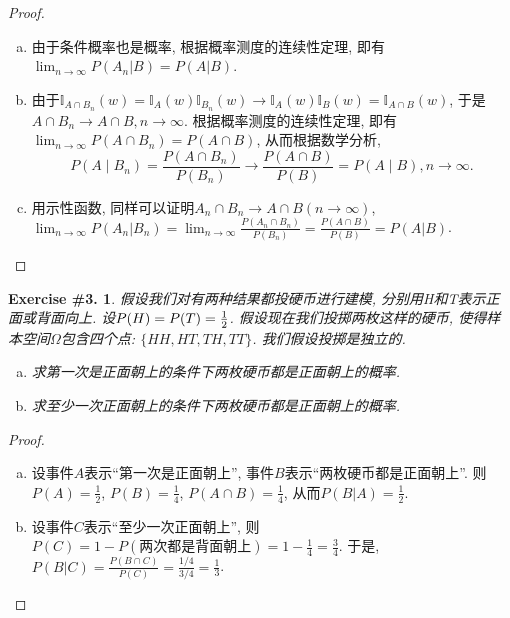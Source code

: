 \documentclass[UTF8, a4paper]{article}
\newtheorem{exercise}{Exercise \#3.}
\begin{document}
\begin{proof}
\begin{enumerate}[a)]
    \item 由于条件概率也是概率, 根据概率测度的连续性定理, 即有\(\lim_{n \to \infty} P(A_n |B) = P(A|B)\).
    \item 由于\(\mathbb{I}_{A\cap B_n}(w) =  \mathbb{I}_A (w)\mathbb{I}_{B_n}(w) \to \mathbb{I}_A(w) \mathbb{I}_B(w) = \mathbb{I}_{A\cap B}(w)\), 于是\(A \cap B_n \to A \cap B, n \to \infty\). 根据概率测度的连续性定理, 即有\(\lim_{n \to \infty} P(A \cap B_n) = P(A \cap B)\), 从而根据数学分析, $$
P\left(A \mid B_n\right)=\frac{P\left(A \cap B_n\right)}{P\left(B_n\right)} \rightarrow \frac{P(A \cap B)}{P(B)}=P(A \mid B) , n\to \infty.
$$
    \item 用示性函数, 同样可以证明\(A_n \cap B_n \to A\cap B(n \to \infty)\), \(\lim_{n\to \infty}P(A_n | B_n) = \lim_{n\to \infty}\frac{P(A_n \cap B_n)}{P(B_n)} = \frac{P(A \cap B)}{P(B)}= P(A|B)\).
\end{enumerate}
\end{proof}


\begin{framed}
\begin{exercise}
    假设我们对有两种结果都投硬币进行建模, 分别用H和T表示正面或背面向上.
    设\(P(H) = P(T) = {1 \over 2}\). 假设现在我们投掷两枚这样的硬币, 使得样本空间\(\Omega\)包含四个点: \(\{HH, HT, TH, TT\}\).
    我们假设投掷是独立的.
    \begin{enumerate}[a)]
        \item 求第一次是正面朝上的条件下两枚硬币都是正面朝上的概率.
        \item 求至少一次正面朝上的条件下两枚硬币都是正面朝上的概率.
    \end{enumerate}
\end{exercise}
\end{framed}

\begin{proof}
\begin{enumerate}[a)]
    \item 设事件\(A\)表示``第一次是正面朝上'', 事件\(B\)表示``两枚硬币都是正面朝上''. 则\(P(A) = \frac{1}{2}\), \(P(B) = \frac{1}{4}\), \(P(A \cap B) = \frac{1}{4}\), 从而\(P(B|A) = \frac{1}{2}\).
    \item 设事件\(C\)表示``至少一次正面朝上'', 则\(P(C) = 1 - P(\text{两次都是背面朝上}) = 1 - \frac{1}{4} = \frac{3}{4}\). 于是, \(P(B|C) = \frac{P(B \cap C)}{P(C)} = \frac{1/4}{3/4} = \frac{1}{3}\).
\end{enumerate}
\end{proof}
\end{document}
